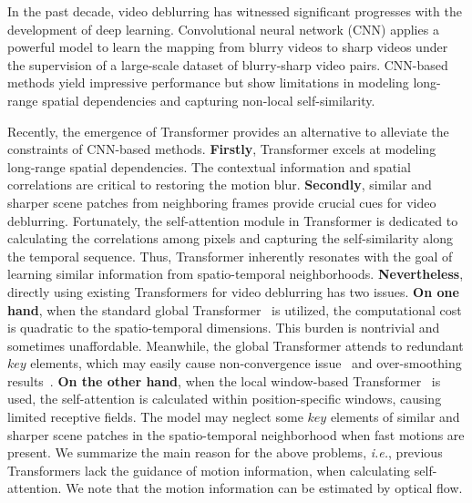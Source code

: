 \documentclass{article}
\begin{document}
	In the past decade, video deblurring has witnessed significant progresses with the development of deep learning. Convolutional neural network (CNN) applies a powerful model to learn the mapping from blurry videos to sharp videos under the supervision of a large-scale dataset of blurry-sharp video pairs. CNN-based methods yield impressive performance but show limitations in modeling long-range spatial dependencies and capturing non-local self-similarity.
	
	Recently, the emergence of Transformer provides an alternative to alleviate the constraints of CNN-based methods. \textbf{Firstly}, Transformer excels at modeling long-range spatial dependencies. The contextual information and spatial correlations are critical to restoring the motion blur. \textbf{Secondly}, similar and sharper scene patches from neighboring frames provide crucial cues for video deblurring. Fortunately, the self-attention module in Transformer is dedicated to calculating the correlations among pixels and capturing the self-similarity along the temporal sequence. Thus, Transformer inherently resonates with the goal of learning similar information from spatio-temporal neighborhoods. \textbf{Nevertheless}, directly using existing  Transformers for video deblurring has two issues. \textbf{On one hand}, when the standard global Transformer~\cite{global_msa} is utilized, the computational cost is quadratic to the spatio-temporal dimensions. This burden is nontrivial and sometimes unaffordable. Meanwhile, the global Transformer attends to redundant $key$ elements, which may easily cause non-convergence issue~\cite{de_detr} and over-smoothing results~\cite{xiangtl_gald}. \textbf{On the other hand}, when the local window-based Transformer~\cite{liu2021swin} is used, the self-attention is calculated within position-specific windows, causing limited receptive fields. The model may neglect some $key$ elements of similar and sharper scene patches in the spatio-temporal neighborhood when fast motions are present. We summarize the main reason for the above problems, \emph{i.e.}, previous Transformers lack the guidance of motion information, when calculating self-attention. We note that the motion information can be estimated by optical flow.
	
\end{document}
